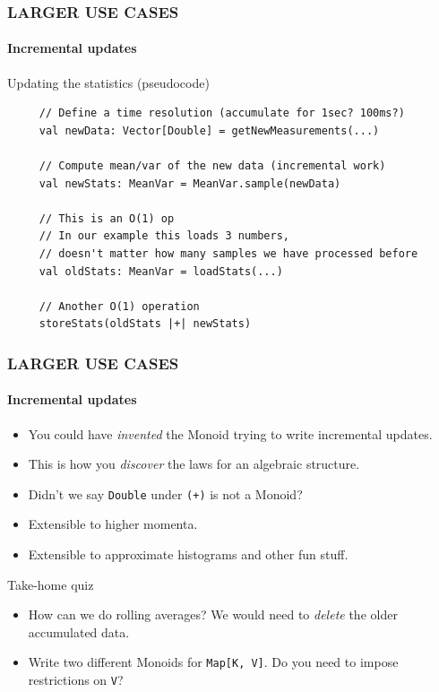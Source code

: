 \documentclass{beamer}
\begin{document}
\begin{frame}[fragile] \frametitle{LARGER USE CASES}
  \framesubtitle{Incremental updates}
  \begin{block}{Updating the statistics (pseudocode)}
  \begin{lstlisting}
     // Define a time resolution (accumulate for 1sec? 100ms?)
     val newData: Vector[Double] = getNewMeasurements(...)

     // Compute mean/var of the new data (incremental work)
     val newStats: MeanVar = MeanVar.sample(newData)

     // This is an O(1) op
     // In our example this loads 3 numbers,
     // doesn't matter how many samples we have processed before
     val oldStats: MeanVar = loadStats(...)

     // Another O(1) operation
     storeStats(oldStats |+| newStats)
  \end{lstlisting}
  \end{block}
\end{frame}


\begin{frame} \frametitle{LARGER USE CASES}
  \framesubtitle{Incremental updates}
  \begin{itemize}
    \item You could have \emph{invented} the Monoid trying to write incremental updates.
    \item This is how you \emph{discover} the laws for an algebraic structure.
    \item Didn't we say \texttt{Double} under \texttt{(+)} is not a Monoid?
    \item Extensible to higher momenta.
    \item Extensible to approximate histograms and other fun stuff.
  \end{itemize}
  \begin{block}{Take-home quiz}
    \begin{itemize}
    \item How can we do rolling averages? We would need to \emph{delete} the older
    accumulated data.
    \item Write two different Monoids for \texttt{Map[K, V]}. Do you need to
      impose restrictions on \texttt{V}?
    \end{itemize}
  \end{block}
\end{frame}
\end{document}
